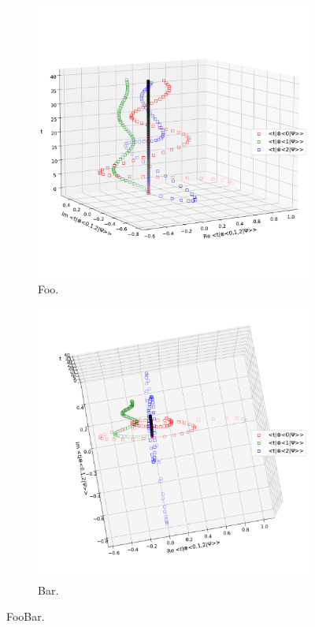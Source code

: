 \begin{figure}[h]
  \begin{subfigure}[b]{\textwidth}
    \centering
    \includegraphics[height=0.41\textheight,clip,trim=0 90 0 140]{img/3ldetect/PWSpaceTime_side.pdf}
    \caption{Foo.}
  \end{subfigure}
  \par\bigskip
  \begin{subfigure}[b]{\textwidth}
    \centering
    \includegraphics[height=0.48\textheight,clip,trim= 0 60 0 100]{img/3ldetect/PWSpaceTime_top.pdf}
    \caption{Bar.}
  \end{subfigure}
  \caption{FooBar.}
\end{figure}

